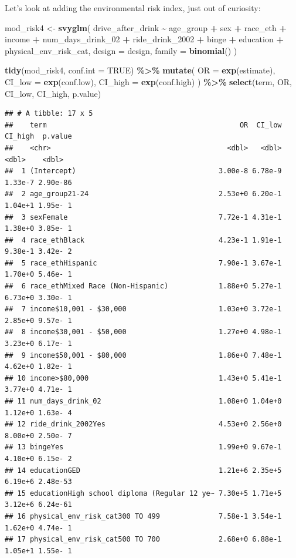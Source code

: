 \documentclass[
]{article}
\newenvironment{Shaded}{\begin{snugshade}}{\end{snugshade}}
\newcommand{\AttributeTok}[1]{\textcolor[rgb]{0.13,0.29,0.53}{#1}}
\newcommand{\ConstantTok}[1]{\textcolor[rgb]{0.56,0.35,0.01}{#1}}
\newcommand{\FunctionTok}[1]{\textcolor[rgb]{0.13,0.29,0.53}{\textbf{#1}}}
\newcommand{\NormalTok}[1]{#1}
\newcommand{\OtherTok}[1]{\textcolor[rgb]{0.56,0.35,0.01}{#1}}
\newcommand{\SpecialCharTok}[1]{\textcolor[rgb]{0.81,0.36,0.00}{\textbf{#1}}}
\begin{document}
Let's look at adding the environmental risk index, just out of
curiosity:

\begin{Shaded}
\begin{Highlighting}[]
\NormalTok{mod\_risk4 }\OtherTok{\textless{}{-}} \FunctionTok{svyglm}\NormalTok{(}
\NormalTok{  drive\_after\_drink }\SpecialCharTok{\textasciitilde{}}\NormalTok{ age\_group }\SpecialCharTok{+}\NormalTok{ sex }\SpecialCharTok{+}\NormalTok{ race\_eth }\SpecialCharTok{+}\NormalTok{ income }\SpecialCharTok{+} 
\NormalTok{     num\_days\_drink\_02 }\SpecialCharTok{+}\NormalTok{ ride\_drink\_2002 }\SpecialCharTok{+}\NormalTok{ binge }\SpecialCharTok{+}\NormalTok{ education }\SpecialCharTok{+}
\NormalTok{    physical\_env\_risk\_cat,}
  \AttributeTok{design =}\NormalTok{ design,}
  \AttributeTok{family =} \FunctionTok{binomial}\NormalTok{()}
\NormalTok{) }

\FunctionTok{tidy}\NormalTok{(mod\_risk4, }\AttributeTok{conf.int =} \ConstantTok{TRUE}\NormalTok{) }\SpecialCharTok{\%\textgreater{}\%}
  \FunctionTok{mutate}\NormalTok{(}
    \AttributeTok{OR =} \FunctionTok{exp}\NormalTok{(estimate),}
    \AttributeTok{CI\_low =} \FunctionTok{exp}\NormalTok{(conf.low),}
    \AttributeTok{CI\_high =} \FunctionTok{exp}\NormalTok{(conf.high)}
\NormalTok{  ) }\SpecialCharTok{\%\textgreater{}\%}
  \FunctionTok{select}\NormalTok{(term, OR, CI\_low, CI\_high, p.value) }
\end{Highlighting}
\end{Shaded}

\begin{verbatim}
## # A tibble: 17 x 5
##    term                                              OR  CI_low CI_high  p.value
##    <chr>                                          <dbl>   <dbl>   <dbl>    <dbl>
##  1 (Intercept)                                  3.00e-8 6.78e-9 1.33e-7 2.90e-86
##  2 age_group21-24                               2.53e+0 6.20e-1 1.04e+1 1.95e- 1
##  3 sexFemale                                    7.72e-1 4.31e-1 1.38e+0 3.85e- 1
##  4 race_ethBlack                                4.23e-1 1.91e-1 9.38e-1 3.42e- 2
##  5 race_ethHispanic                             7.90e-1 3.67e-1 1.70e+0 5.46e- 1
##  6 race_ethMixed Race (Non-Hispanic)            1.88e+0 5.27e-1 6.73e+0 3.30e- 1
##  7 income$10,001 - $30,000                      1.03e+0 3.72e-1 2.85e+0 9.57e- 1
##  8 income$30,001 - $50,000                      1.27e+0 4.98e-1 3.23e+0 6.17e- 1
##  9 income$50,001 - $80,000                      1.86e+0 7.48e-1 4.62e+0 1.82e- 1
## 10 income>$80,000                               1.43e+0 5.41e-1 3.77e+0 4.71e- 1
## 11 num_days_drink_02                            1.08e+0 1.04e+0 1.12e+0 1.63e- 4
## 12 ride_drink_2002Yes                           4.53e+0 2.56e+0 8.00e+0 2.50e- 7
## 13 bingeYes                                     1.99e+0 9.67e-1 4.10e+0 6.15e- 2
## 14 educationGED                                 1.21e+6 2.35e+5 6.19e+6 2.48e-53
## 15 educationHigh school diploma (Regular 12 ye~ 7.30e+5 1.71e+5 3.12e+6 6.24e-61
## 16 physical_env_risk_cat300 TO 499              7.58e-1 3.54e-1 1.62e+0 4.74e- 1
## 17 physical_env_risk_cat500 TO 700              2.68e+0 6.88e-1 1.05e+1 1.55e- 1
\end{verbatim}
\end{document}
